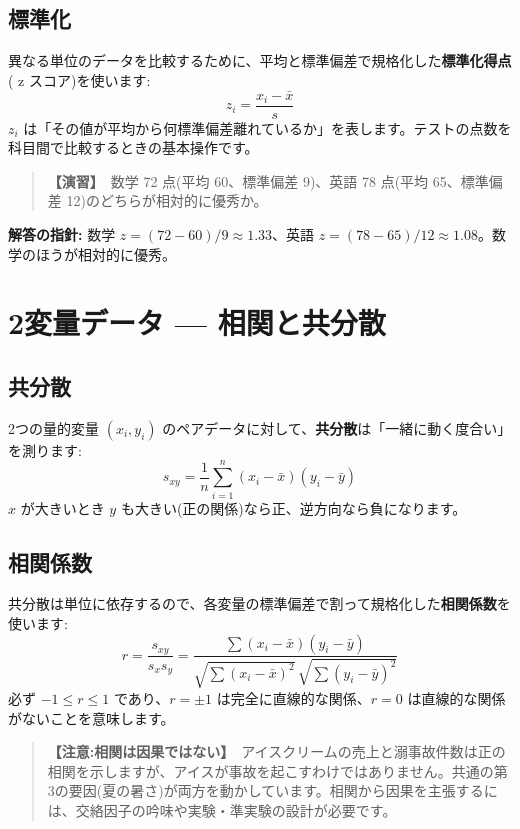 \documentclass{article}
\begin{document}
\subsection{標準化}

異なる単位のデータを比較するために、平均と標準偏差で規格化した\textbf{標準化得点}( z スコア)を使います:
\[ z_i = \frac{x_i - \bar{x}}{s} \]
\(z_i\) は「その値が平均から何標準偏差離れているか」を表します。テストの点数を科目間で比較するときの基本操作です。

\begin{quote}
\textbf{【演習】}\ 数学 72 点(平均 60、標準偏差 9)、英語 78 点(平均 65、標準偏差 12)のどちらが相対的に優秀か。
\end{quote}

\textbf{解答の指針:} 数学 \(z = (72-60)/9 \approx 1.33\)、英語 \(z = (78-65)/12 \approx 1.08\)。数学のほうが相対的に優秀。

\section{2変量データ — 相関と共分散}

\subsection{共分散}

2つの量的変量 \((x_i, y_i)\) のペアデータに対して、\textbf{共分散}は「一緒に動く度合い」を測ります:
\[ s_{xy} = \frac{1}{n} \sum_{i=1}^{n} (x_i - \bar{x})(y_i - \bar{y}) \]
\(x\) が大きいとき \(y\) も大きい(正の関係)なら正、逆方向なら負になります。

\subsection{相関係数}

共分散は単位に依存するので、各変量の標準偏差で割って規格化した\textbf{相関係数}を使います:
\[ r = \frac{s_{xy}}{s_x s_y} = \frac{\sum (x_i - \bar{x})(y_i - \bar{y})}{\sqrt{\sum (x_i - \bar{x})^2}\, \sqrt{\sum (y_i - \bar{y})^2}} \]
必ず \(-1 \le r \le 1\) であり、\(r = \pm 1\) は完全に直線的な関係、\(r = 0\) は直線的な関係がないことを意味します。

\begin{quote}
\textbf{【注意:相関は因果ではない】}\ アイスクリームの売上と溺事故件数は正の相関を示しますが、アイスが事故を起こすわけではありません。共通の第3の要因(夏の暑さ)が両方を動かしています。相関から因果を主張するには、交絡因子の吟味や実験・準実験の設計が必要です。
\end{quote}
\end{document}
